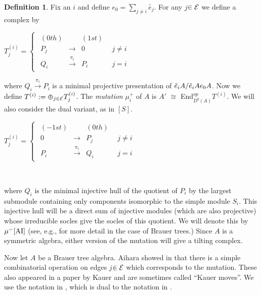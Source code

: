 \documentclass[11pt,english]{article}
\numberwithin{figure}{section}
\numberwithin{equation}{section}
\numberwithin{table}{section}
\theoremstyle{definition}
\newtheorem{defn}{Definition}[section]
\theoremstyle{remark}
\begin{document}
\noindent \begin{defn}
	Fix an $i$ and define $e_{0}=\underset{j\neq i}{\sum}$$\tilde{e_{j}}$.
	For any $j$$\ensuremath{{\cal \in E}}$ we define a complex by 
	
	$T_{j}^{(i)}=\begin{cases}
		\begin{array}{cccc}
			(0th) & \, & (1st) & \,\\
			P_{j} & \longrightarrow & 0 & \:\:j\neq i\\
			Q_{i} & \overset{\pi_{i}}{\longrightarrow} & P_{i} & \:\:j=i
		\end{array} & \,\end{cases}$
	
	\noindent where $Q_{i}\overset{\pi_{i}}{\longrightarrow}P_{i}$ is
	a minimal projective presentation of $\text{\ensuremath{\tilde{e}_{i}A}}/\tilde{e}_{i}Ae_{0}A$.
	Now we define $T^{(i)}:=\varoplus_{j\ensuremath{{\cal \in E}}}T_{j}^{(i)}$.
	The\textit{ mutation }$\mu_{i}^{+}$ of $A$ is $A'$ $\cong$ End$^{op}_{D^{b}(A)}$$T^{(i)}$.
	We will also consider the dual variant, as in $[S].$
	
	$T_{j}^{(i)}=\begin{cases}
		\begin{array}{cccc}
			(-1st) & \, & (0th) & \,\\
			0 & \longrightarrow &P_{j} & \:\:j\neq i\\
			P_{i} & \overset{\pi_{i}}{\longrightarrow} & Q_{i} & \:\:j=i
		\end{array} & \,\end{cases}$
	
	~
	
	\noindent where $Q_{i}$ is the minimal injective hull of the
	quotient of $P_{i}$ by the largest submodule containing only
	components isomorphic to the simple module  $S_{i}$.  This injective hull will be a direct
	sum of injective modules (which are also projective) whose irreducible
	socles give the socles of this quotient. We will denote this 
	by $\mu^{-} \cite{AI}$ (see, e.g., \cite{Zv} for more detail in the case of Brauer trees.)
	Since $A$ is a symmetric algebra, either version of the mutation will give a tilting complex. 
\end{defn}



\noindent Now let $A$ be a Brauer tree algebra.  Aihara showed in \cite{Ai} that there is a simple combinatorial
operation on edges $j$$\ensuremath{{\cal \in E}}$ which corresponds to the mutation. These also appeared in a paper by Kauer and are sometimes called ``Kauer moves''. We use the notation in \cite{K}, which is dual to the notation in \cite{Ai}.
\end{document}
